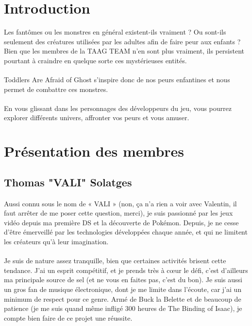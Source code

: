 \documentclass[12pt,a4paper]{article}
\begin{document}
\newpage
\vspace*{1mm}
\section{Introduction}
\paragraph{}
    Les fantômes ou les monstres en général existent-ils vraiment ? Ou sont-ils seulement des créatures utilisées par les adultes afin de faire peur aux enfants ? Bien que les membres de la TAAG TEAM n’en sont plus vraiment, ils persistent pourtant à craindre en quelque sorte ces mystérieuses entités. 
    \\
    \vspace*{0.2cm}
    \\
    Toddlers Are Afraid of Ghost s’inspire donc de nos peurs enfantines et nous permet de combattre ces monstres. 
    \\
    \vspace*{0.2cm}
    \\
    En vous glissant dans les personnages des développeurs du jeu, vous pourrez explorer différents univers, affronter vos peurs et vous amuser. 
\\
\vspace*{.1cm}
\section{Présentation des membres}
\subsection{Thomas "VALI" Solatges}
\paragraph{}
Aussi connu sous le nom de « VALI » (non, ça n'a rien a voir avec Valentin, il faut arrêter de me poser cette question, merci), je suis passionné par les jeux vidéo depuis ma première DS et la découverte de Pokémon. Depuis, je ne cesse d’être émerveillé par les technologies développées chaque année, et qui ne limitent les créateurs qu’à leur imagination.
\\
\\
Je suis de nature assez tranquille, bien que certaines activités brisent cette tendance. J’ai un esprit compétitif, et je prends très à cœur le défi, c’est d’ailleurs ma principale source de sel (et ne vous en faites pas, c’est du bon). Je suis aussi un gros fan de musique électronique, dont je me limite dans l’écoute, car j’ai un minimum de respect pour ce genre. Armé de Buck la Belette et de beaucoup de patience (je me suis quand même infligé 300 heures de The Binding of Isaac), je compte bien faire de ce projet une réussite.
\\
\newpage
\vspace*{.1cm}
\end{document}
